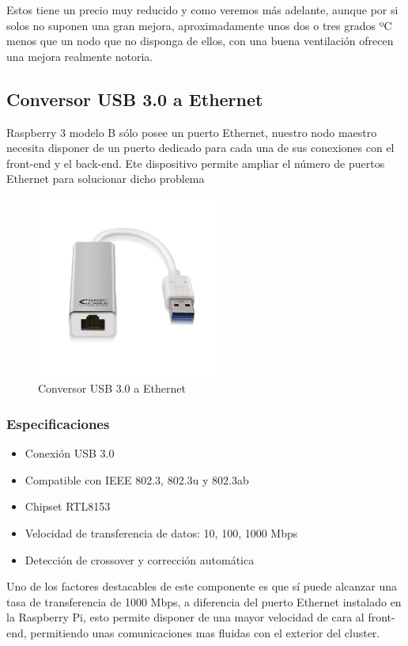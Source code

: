 Estos tiene un precio muy reducido y como veremos más adelante, aunque por si solos no suponen una gran mejora, aproximadamente unos dos o tres grados ºC menos que un nodo que no disponga de ellos, con una buena ventilación ofrecen una mejora realmente notoria.

\subsection{Conversor USB 3.0 a Ethernet}

Raspberry 3 modelo B sólo posee un puerto Ethernet, nuestro nodo maestro necesita disponer de un puerto dedicado para cada una de sus conexiones con el front-end y el back-end. Ete dispositivo permite ampliar el número de puertos Ethernet para solucionar dicho problema 

\begin{figure}[H]
	\centering
  	\includegraphics[width=60mm]{pics/ethernetUSB.jpg}
   	\caption[Conversor USB 3.0 a Ethernet]{Conversor USB 3.0 a Ethernet}
   \label{figure2.3}
\end{figure}

\subsubsection{Especificaciones}

\begin{itemize}
  \item Conexión USB 3.0
  \item Compatible con IEEE 802.3, 802.3u y 802.3ab
  \item Chipset RTL8153
  \item Velocidad de transferencia de datos: 10, 100, 1000 Mbps
  \item Detección de crossover y corrección automática
\end{itemize}

Uno de los factores destacables de este componente es que sí puede alcanzar una tasa de transferencia de 1000 Mbps, a diferencia del puerto Ethernet instalado en la Raspberry Pi, esto permite disponer de una mayor velocidad de cara al front-end, permitiendo unas comunicaciones mas fluidas con el exterior del cluster. 

